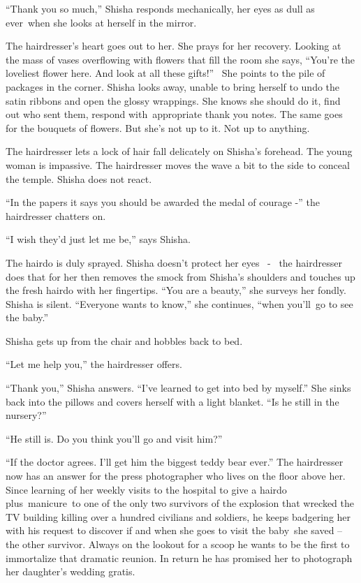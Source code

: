 \documentclass[twoside,11pt]{book}
\begin{document}
``Thank you so much,'' Shisha responds mechanically, her eyes as dull as ever~when she looks
at herself in the mirror.

The hairdresser's heart goes out to her. She prays for her recovery. Looking at the mass of vases overflowing with
flowers that fill the room she says, ``You're the loveliest flower here. And look at all these
gifts!'' \ She points to the pile of packages in the corner. Shisha looks away, unable to bring herself to
undo the satin ribbons and open the glossy wrappings. She knows she should do it, find out who sent them, respond
with~appropriate thank you notes. The same goes for the bouquets of flowers. But she's not up to it. Not up to
anything.

The hairdresser lets a lock of hair fall delicately on Shisha's forehead. The young woman is impassive. The hairdresser
moves the wave a bit to the side to conceal the temple. Shisha does not react.{
}\

``In the papers it says you should be awarded the medal of courage -'' the hairdresser
chatters on.

``I wish they'd just let me be,'' says Shisha{.}

The hairdo is duly sprayed. Shisha doesn't protect{ }her eyes
\ {{}- }\ the hairdresser does that for her then removes the smock from
Shisha's shoulders and touches up the fresh hairdo with her fingertips. ``You are a beauty,''
she surveys her fondly. Shisha is silent. ``Everyone wants to know,'' she continues, ``when you'll~go to
see the baby.''

Shisha gets up from the chair and hobbles back to bed.

``Let me help you,'' the hairdresser offers.

``Thank you,'' Shisha answers. ``I've learned to get into bed by
myself.'' She sinks back into the pillows and covers herself with a light blanket. ``Is he
still in the nursery?'' \

``He still is. Do you think you'll go and visit him?''

``If the doctor agrees. I'll get him the biggest teddy bear ever.'' The hairdresser now has an
answer for the press photographer who lives on the floor above her. Since learning of her weekly visits to the hospital
to give a hairdo plus~manicure~to one of the only two survivors of the explosion that wrecked the TV building killing
over a hundred civilians and soldiers, he keeps badgering her with his request to discover if and when she goes to
visit the baby~she saved -- the other survivor. Always on the lookout for a scoop he wants to be the first to
immortalize that dramatic reunion. In return he has promised her to photograph her daughter's wedding gratis.~
\end{document}
